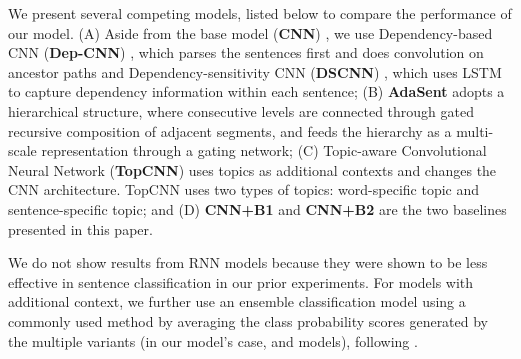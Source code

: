 \documentclass{article}
\begin{document}
We present several competing models, listed below to compare the performance of our model. (A) Aside from the base model (\textbf{CNN}) \cite{Kim2014ConvolutionalNN}, we use Dependency-based CNN (\textbf{Dep-CNN}) \cite{ma2015dependency}, which parses the sentences first and does convolution on ancestor paths and Dependency-sensitivity CNN (\textbf{DSCNN}) \cite{zhang2016dependency}, which uses LSTM to capture dependency information within each sentence; (B) \textbf{AdaSent} \cite{zhao2015self} adopts a hierarchical structure, where consecutive levels are connected through gated recursive composition of adjacent segments, and feeds the hierarchy as a multi-scale representation through a gating network;
(C) Topic-aware Convolutional Neural Network (\textbf{TopCNN}) \cite{zhao2017topic} uses topics as additional contexts and changes the CNN architecture. TopCNN uses two types of topics: word-specific topic and sentence-specific topic; and
(D) \textbf{CNN+B1} and \textbf{CNN+B2} are the two baselines presented in this paper. 

We do not show results from RNN models because they were shown to be less effective in sentence classification in our prior experiments.
For models with additional context, we further use an ensemble classification model using a commonly used method by averaging the class probability scores generated by the multiple variants (in our model's case,  and  models), following \cite{zhao2017topic}.
\end{document}
